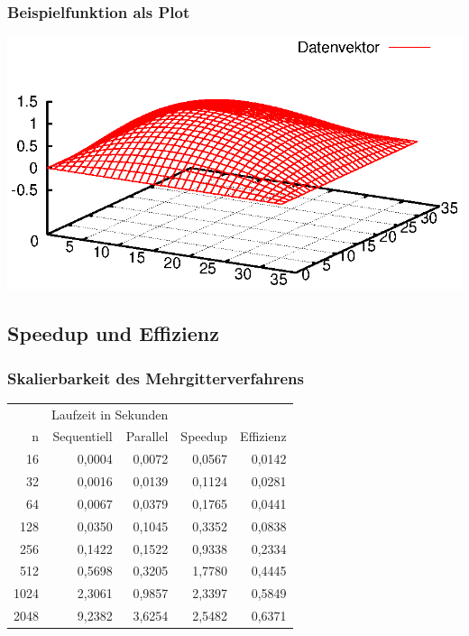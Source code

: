 \documentclass{beamer}
\begin{document}
\begin{frame}\frametitle{Beispielfunktion als Plot}\includegraphics[trim=25 0 25 0, clip, width=\textwidth]{plots/009}\end{frame}

\subsection{Speedup und Effizienz}
\begin{frame}
    \frametitle{Skalierbarkeit des Mehrgitterverfahrens}
    \begin{center}
    \begin{tabular}{|r|r|r|r|r|} \hline
    & \multicolumn{2}{c|}{Laufzeit in Sekunden} & & \\
    n    & Sequentiell & Parallel & Speedup & Effizienz \\ \hline \hline
    16   & 0,0004      & 0,0072   & 0,0567  & 0,0142    \\
    32   & 0,0016      & 0,0139   & 0,1124  & 0,0281    \\
    64   & 0,0067      & 0,0379   & 0,1765  & 0,0441    \\
    128  & 0,0350      & 0,1045   & 0,3352  & 0,0838    \\
    256  & 0,1422      & 0,1522   & 0,9338  & 0,2334    \\
    512  & 0,5698      & 0,3205   & 1,7780  & 0,4445    \\
    1024 & 2,3061      & 0,9857   & 2,3397  & 0,5849    \\
    2048 & 9,2382      & 3,6254   & 2,5482  & 0,6371    \\ \hline
    \end{tabular}
    \end{center}
\end{frame}
\end{document}
